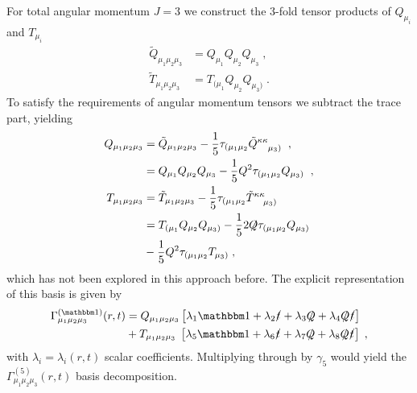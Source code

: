 %
%
%
%
%
For total angular momentum $J=3$ we construct the $3$-fold tensor products of $Q_{\mu_i}$ and 
$T_{\mu_i}$
%
\begin{align}
  \tilde{Q}_{\mu_1\mu_2\mu_3} &= Q_{\mu_1}Q_{\mu_2}Q_{\mu_3} \; , \\
  \tilde{T}_{\mu_1\mu_2\mu_3} &= T_{(\mu_1}Q_{\mu_2}Q_{\mu_3)}\;.
\end{align}
%
To satisfy the requirements of angular momentum tensors we subtract the trace part, yielding
%
\begin{align}
  Q_{\mu_1\mu_2\mu_3} &= \tilde{Q}_{\mu_1\mu_2\mu_3} - \frac{1}{5} 
   \tau_{(\mu_1\mu_2}\tilde{Q}^{\kappa\kappa}_{\phantom{\kappa\kappa}\mu_3)}  \;\; , \nonumber\\
  &= Q_{\mu_1}Q_{\mu_2}Q_{\mu_3} - \frac{ 1 }{5}Q^2 
   \tau_{(\mu_1\mu_2} Q_{\mu_3)} \; \;, \\
  T_{\mu_1\mu_2\mu_3} &=\tilde{T}_{\mu_1\mu_2\mu_3} -\frac{1}{5} 
   \tau_{(\mu_1\mu_2}\tilde{T}^{\kappa\kappa}_{\phantom{\kappa\kappa}\mu_3)}  \nonumber \\
  &= T_{(\mu_1}Q_{\mu_2} Q_{\mu_3)} - \frac{1}{5} 
   2\mkern-4mu \not \mkern-6mu Q\tau_{(\mu_1\mu_2}Q_{\mu_3)}  \nonumber \\
   & - \frac{1}{5} Q^2\tau_{(\mu_1\mu_2} T_{\mu_3)}   \;,
\end{align}
%
which has not been explored in this approach before. The explicit representation of this basis is given by
%
\begin{align}
%
\Gamma^{(\ONE)}_{\mu_1\mu_2\mu_3}(r,t) &= 
   Q_{\mu_1\mu_2\mu_3} \left[ \lambda_1 \ONE + \lambda_2\slashed{t} +\lambda_3 \slashed{Q} + \lambda_4\slashed{Q}\slashed{t}  \right]\nonumber\\
 &+T_{\mu_1\mu_2\mu_3}\; \left[ \lambda_5 \ONE + \lambda_6\slashed{t} +\lambda_7 \slashed{Q} + \lambda_8\slashed{Q}\slashed{t}  \right]\;,
%
\end{align}
with $\lambda_i=\lambda_i(r,t)$ scalar coefficients. Multiplying through by $\gamma_5$ would yield the 
$\Gamma^{(5)}_{\mu_1\mu_2\mu_3}(r,t)$ basis decomposition.


